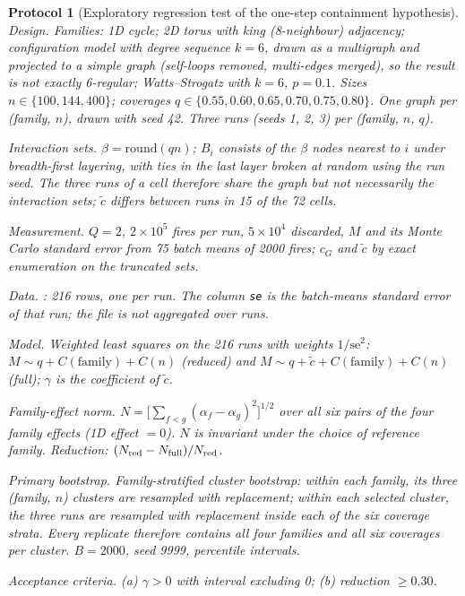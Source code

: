 \documentclass[pdflatex,sn-mathphys-num]{sn-jnl}
\newcommand{\BootB}{2000}
\newcommand{\CellsCtVary}{15}
\theoremstyle{thmstyleone}%
\theoremstyle{thmstylethree}%
\newtheorem{protocol}[theorem]{Protocol}
\theoremstyle{thmstyletwo}%
\newcommand{\ctil}{\tilde{c}}
\newcommand{\cG}{c_G}
\begin{document}
\begin{protocol}[Exploratory regression test of the one-step containment hypothesis]
\label{prot:F4}
\emph{Design.} Families: 1D cycle; 2D torus with king (8-neighbour)
adjacency; configuration model with degree sequence $k=6$, drawn as a
multigraph and projected to a simple graph (self-loops removed,
multi-edges merged), so the result is not exactly 6-regular;
Watts--Strogatz with $k=6$, $p=0.1$. Sizes $n\in\{100,144,400\}$;
coverages $q\in\{0.55,0.60,0.65,0.70,0.75,0.80\}$. One graph per
(family, $n$), drawn with seed 42. Three runs (seeds 1, 2, 3) per
(family, $n$, $q$).

\emph{Interaction sets.} $\beta=\mathrm{round}(qn)$; $B_i$ consists of the
$\beta$ nodes nearest to $i$ under breadth-first layering, with ties in
the last layer broken at random using the run seed. The three runs of a
cell therefore share the graph but not necessarily the interaction sets;
$\ctil$ differs between runs in \CellsCtVary{} of the 72 cells.

\emph{Measurement.} $Q=2$, $2\times10^5$ fires per run, $5\times10^4$
discarded, $M$ and its Monte Carlo standard error from 75 batch means of
2000 fires; $\cG$ and $\ctil$ by exact enumeration on the truncated sets.

\emph{Data.} : 216 rows, one
per run. The column \texttt{se} is the batch-means standard error of that
run; the file is not aggregated over runs.

\emph{Model.} Weighted least squares on the 216 runs with weights
$1/\mathrm{se}^2$: $M\sim q+C(\text{family})+C(n)$ (reduced) and
$M\sim q+\ctil+C(\text{family})+C(n)$ (full); $\gamma$ is the coefficient
of $\ctil$.

\emph{Family-effect norm.} $N=\big[\sum_{f<g}(\alpha_f-\alpha_g)^2\big]^{1/2}$
over all six pairs of the four family effects (1D effect $=0$). $N$ is
invariant under the choice of reference family. Reduction:
$(N_{\rm red}-N_{\rm full})/N_{\rm red}$.

\emph{Primary bootstrap.} Family-stratified cluster bootstrap: within
each family, its three (family, $n$) clusters are resampled with
replacement; within each selected cluster, the three runs are resampled
with replacement inside each of the six coverage strata. Every replicate
therefore contains all four families and all six coverages per cluster.
$B=\BootB$, seed 9999, percentile intervals.

\emph{Acceptance criteria.} (a) $\gamma>0$ with interval excluding 0;
(b) reduction $\ge0.30$.


\end{protocol}
\end{document}
